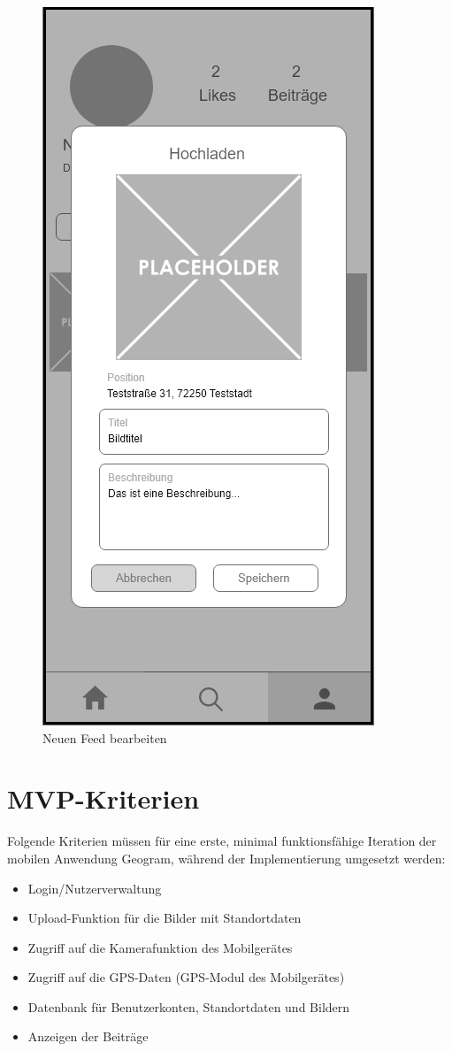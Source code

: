 \begin{figure}[H]
\begin{minipage}{.5\textwidth}
      \includegraphics[width=.6\linewidth]{images/PopUp_Edit_New_Photo_MockUp.png}
      \caption{Neuen Feed bearbeiten}
      \label{fig:edit_new_feed}
    \end{minipage}
\end{figure}

\section{MVP-Kriterien\label{sec2.2:Unterpunkt-2}}

Folgende Kriterien müssen für eine erste, minimal funktionsfähige Iteration der mobilen Anwendung \glqq Geogram\grqq{}, während der Implementierung umgesetzt werden:

\begin{itemize}
    \item Login/Nutzerverwaltung
    \item Upload-Funktion für die Bilder mit Standortdaten
    \item Zugriff auf die Kamerafunktion des Mobilgerätes
    \item Zugriff auf die GPS-Daten (GPS-Modul des Mobilgerätes)
    \item Datenbank für Benutzerkonten, Standortdaten und Bildern
    \item Anzeigen der Beiträge
\end{itemize}

